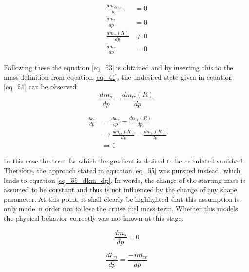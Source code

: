 \begin{align}
    \frac{dm_{struc}}{dp} &= 0 \label{eq_51}\\
    \frac{dm_{p}}{dp} &= 0\\
    \frac{dm_{cr}(R)}{dp} &\neq 0\\
    \frac{dm_{o}}{dp} &= 0 \label{eq_52}
\end{align}

Following these the equation \eqref{eq_53} is 
obtained and by inserting this to the mass definition 
from equation \eqref{eq_41}, the undesired state 
given in 
equation \eqref{eq_54} can be observed. 
\begin{equation}
    \label{eq_53}
    \frac{dm_s}{dp} = \frac{dm_{cr}(R)}{dp}
\end{equation}

\begin{equation}
    \label{eq_54}
    \begin{aligned}
        \frac{dk_m}{dp} &= \frac{dm_s}{dp} - \frac{dm_{cr}(R)}{dp}\\
                    &\rightarrow \frac{dm_{cr}(R)}{dp} -  \frac{dm_{cr}(R)}{dp} \\     
        &\Rightarrow 0
    \end{aligned}
\end{equation}

In this case the term for which the gradient is desired to be calculated 
vanished. Therefore, the approach stated in 
equation \eqref{eq_55} was pursued instead, which leads 
to equation \eqref{eq_55_dkm_dp}. In words, 
the change of the starting mass is assumed to be constant and 
thus is not influenced by the change of any shape parameter.
At this point, it shall clearly be highlighted that 
this assumption is only made in 
order not to lose the cruise fuel mass term. Whether 
this models the physical behavior correctly 
was not known at this stage.

\begin{equation}
    \label{eq_55}
    \frac{dm_s}{dp}  = 0 
\end{equation}

\begin{equation}
    \label{eq_55_dkm_dp}
    \frac{dk_m}{dp}  = \frac{-dm_{cr}}{dp}
\end{equation}

